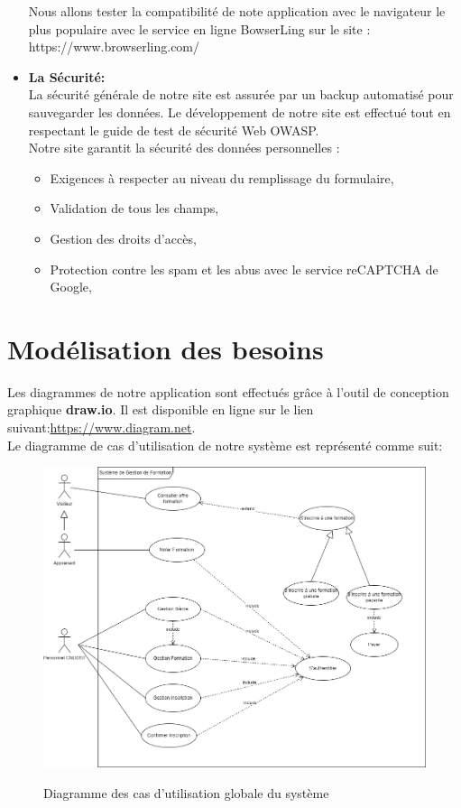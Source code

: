 \begin{itemize}
\begin{itemize}
	\end{itemize}
	
	Nous allons tester la compatibilité de note application avec le navigateur le plus populaire
	avec le service en ligne BowserLing sur le site : \\https://www.browserling.com/
	\item \textbf{La Sécurité:}\\
	La sécurité générale de notre site est assurée par un backup automatisé pour
	sauvegarder les données. Le développement de notre site est effectué tout en respectant
	le guide de test de sécurité Web OWASP.\\
	Notre site garantit la sécurité des données personnelles :
	\begin{itemize}
		\item Exigences à respecter au niveau du remplissage du formulaire,
		\item Validation de tous les champs,
		\item Gestion des droits d’accès,
		\item Protection contre les spam et les abus avec le service reCAPTCHA de Google,
	\end{itemize}
\end{itemize}
\section{Modélisation des besoins}
Les diagrammes de notre application sont effectués grâce à l'outil de conception graphique \textbf{draw.io}.
Il est disponible en ligne sur le lien suivant:\url{https://www.diagram.net}.\\
Le diagramme de cas d'utilisation de notre système est représenté comme suit:
\begin{figure}[!h]
	\centering
	{\includegraphics[width=1\textwidth]{D) IMAGES/casutlglobal.png}}
	\caption{Diagramme des cas d'utilisation globale du système}
	\label{Diagramme3}
\end{figure}

